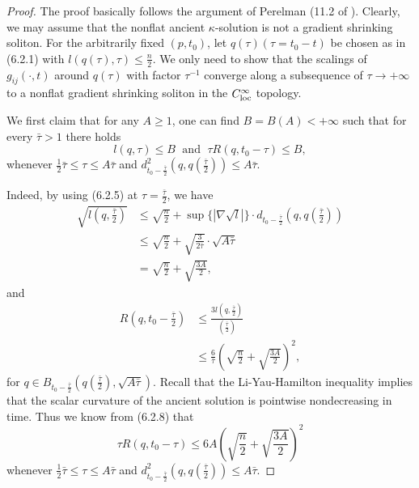 \begin{proof}
   The proof basically follows the argument of Perelman
(11.2 of \cite{P1}).  Clearly, we may assume that the nonflat
ancient $\kappa$-solution is not a gradient shrinking soliton. For
the arbitrarily fixed $(p,t_0)$, let $q(\tau) (\tau=t_0 -t)$ be
chosen as in (6.2.1) with $l(q(\tau),\tau) \leq \frac{n}{2}$. We
only need to show that the scalings of $g_{ij}(\cdot,t)$ around
$q(\tau)$ with factor $\tau^{-1}$ converge along a subsequence of
$\tau \rightarrow +\infty$ to a nonflat gradient shrinking soliton
in the $C^{\infty}_{\rm loc}$ topology.

We first claim that for any $A \geq 1$, one can find
$B=B(A)<+\infty$ such that for every $\bar{\tau}>1$ there holds
\begin{equation} l(q,\tau)\leq B \; \mbox{ and }\;  \tau R(q,t_0-\tau)\leq B,
\end{equation} whenever $\frac{1}{2}\bar{\tau}\leq \tau \leq A\bar{\tau}$ and
$d_{t_0-\frac{\bar{\tau}}{2}}^2 (q,q(\frac{\bar{\tau}}{2}))\leq
A\bar{\tau}.$

Indeed, by using (6.2.5) at $\tau=\frac{\bar{\tau}}{2}$, we have
\begin{align}
\sqrt{l(q,\frac{\bar{\tau}}{2})} &  \leq \sqrt{\frac{n}{2}}+
\sup\{|\nabla \sqrt{l}|\}\cdot d_{t_0-\frac{\bar{\tau}}{2}}
\left(q,q\left(\frac{\bar{\tau}}{2}\right)\right) \\
&  \leq \sqrt{\frac{n}{2}}+ \sqrt{\frac{3}{2\bar{\tau}}}\cdot
\sqrt{A\bar{\tau}} \nonumber\\
&  = \sqrt{\frac{n}{2}}+\sqrt{\frac{3A}{2}},\nonumber
\end{align}  %
and
\begin{align}
R\left(q,t_0-\frac{\bar{\tau}}{2}\right)&  \leq
\frac{3l(q,\frac{\bar{\tau}}{2})}{(\frac{\bar{\tau}}{2})}\\
&  \leq
\frac{6}{\bar{\tau}}\left(\sqrt{\frac{n}{2}}+\sqrt{\frac{3A}{2}}\right)^2,\nonumber
\end{align}  %
for $q\in
B_{t_0-\frac{\bar{\tau}}{2}}(q(\frac{\bar{\tau}}{2}),\sqrt{A\bar{\tau}})$.
Recall that the Li-Yau-Hamilton inequality implies that the scalar
curvature of the ancient solution is pointwise nondecreasing in
time. Thus we know from (6.2.8) that \begin{equation} \tau R(q,t_0-\tau)\leq
6A\left(\sqrt{\frac{n}{2}}+\sqrt{\frac{3A}{2}}\right)^2 %
\end{equation} whenever $\frac{1}{2}\bar{\tau}\leq \tau \leq A\bar{\tau}$ and
$d_{t_0-\frac{\bar{\tau}}{2}}^2 (q,q(\frac{\bar{\tau}}{2}))\leq
A\bar{\tau}.$


\end{proof}
